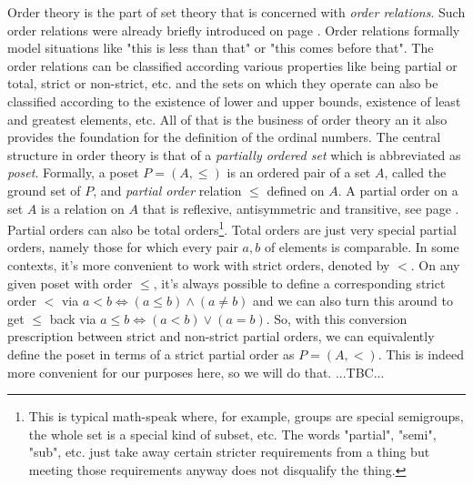 Order theory is the part of set theory that is concerned with \emph{order relations}. Such order relations were already briefly introduced on page \pageref{Par:Orders}. Order relations formally model situations like "this is less than that" or "this comes before that". The order relations can be classified according various properties like being partial or total, strict or non-strict, etc. and the sets on which they operate can also be classified according to the existence of lower and upper bounds, existence of least and greatest elements, etc. All of that is the business of order theory an it also provides the foundation for the definition of the ordinal numbers. The central structure in order theory is that of a \emph{partially ordered set} which is abbreviated as \emph{poset}. Formally, a poset $P = (A, \leq)$ is an ordered pair of a set $A$, called the ground set of $P$, and \emph{partial order} relation $\leq$ defined on $A$. A partial order on a set $A$ is a relation on $A$ that is reflexive, antisymmetric and transitive, see page \pageref{Tab:RelationFeatures}. Partial orders can also be total orders\footnote{This is typical math-speak where, for example, groups are special semigroups, the whole set is a special kind of subset, etc. The words "partial", "semi", "sub", etc. just take away certain stricter requirements from a thing but meeting those requirements anyway does not disqualify the thing.}. Total orders are just very special partial orders, namely those for which every pair $a,b$ of elements is comparable. In some contexts, it's more convenient to work with strict orders, denoted by $<$. On any given poset with order $\leq$, it's always possible to define a corresponding strict order $<$ via $a < b \Leftrightarrow (a \leq b) \wedge (a \neq b)$ and we can also turn this around to get $\leq$ back via $a \leq b \Leftrightarrow (a < b) \vee (a = b)$. So, with this conversion prescription between strict and non-strict partial orders, we can equivalently define the poset in terms of a strict partial order as $P = (A, <)$. This is indeed more convenient for our purposes here, so we will do that. ...TBC...




